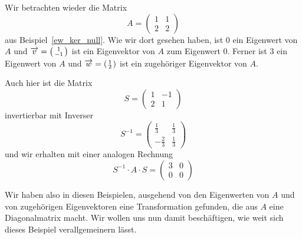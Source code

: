 \begin{beispiel} Wir betrachten wieder die Matrix 
  	$$ A = \left( \begin{matrix} 1 & 1 \\ 2 & 2 \end{matrix} \right) $$
aus Beispiel~\ref{ew_ker_null}. Wie wir dort gesehen haben, ist $0$ ein Eigenwert 
von $A$ und $\overrightarrow{v} = \left( \begin{smallmatrix} 1 \\ -1 \end{smallmatrix} 
\right)$ ist ein Eigenvektor von $A$ zum Eigenwert $0$. Ferner ist
$3$ ein Eigenwert von $A$ und $\overrightarrow{w} = \left( 
\begin{smallmatrix} 1 \\ 2 \end{smallmatrix} \right)$ ist ein zugehöriger Eigenvektor von $A$.

Auch hier ist die Matrix
  	$$ S = \left( \begin{matrix} 1 & -1 \\ 2 & 1 \end{matrix} \right) $$
invertierbar mit Inverser
  	$$ S^{-1} = \left( \begin{matrix} \frac {1}{3} &  \frac {1}{3} \\ 
     -\frac {2}{3} & \frac {1}{3} \end{matrix} \right) $$
und wir erhalten mit einer analogen Rechnung
  	$$ S^{-1} \cdot A \cdot S =  \left( \begin{matrix} 3 & 0 \\ 0 & 0 \end{matrix} \right) $$ 
\end{beispiel}

Wir haben also in diesen Beispielen, ausgehend von den Eigenwerten von $A$ und von 
zugehörigen Eigenvektoren eine Transformation gefunden, die aus $A$ eine 
Diagonalmatrix macht. Wir wollen uns nun damit beschäftigen, wie weit sich dieses 
Beispiel verallgemeinern lässt.


